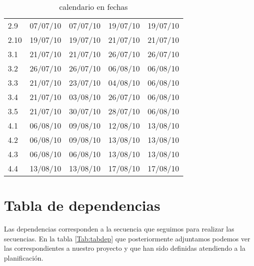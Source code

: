 \documentclass[11pt,a4paper,spanish,twoside]{report}
\begin{document}
\begin{table}[!h]
\begin{tabular}{|b{1.8cm}||b{2.2cm}|b{2.2cm}||b{2.2cm}|b{2.2cm}|}
     2.9   & 07/07/10 & 07/07/10 & 19/07/10 & 19/07/10 \\
     2.10  & 19/07/10 & 19/07/10 & 21/07/10 & 21/07/10 \\
     \hline
     3.1   & 21/07/10 & 21/07/10 & 26/07/10 & 26/07/10 \\
     3.2   & 26/07/10 & 26/07/10 & 06/08/10 & 06/08/10 \\
     3.3   & 21/07/10 & 23/07/10 & 04/08/10 & 06/08/10 \\
     3.4   & 21/07/10 & 03/08/10 & 26/07/10 & 06/08/10 \\
     3.5   & 21/07/10 & 30/07/10 & 28/07/10 & 06/08/10 \\
     \hline
     4.1   & 06/08/10 & 09/08/10 & 12/08/10 & 13/08/10 \\
     4.2   & 06/08/10 & 09/08/10 & 13/08/10 & 13/08/10 \\
     4.3   & 06/08/10 & 06/08/10 & 13/08/10 & 13/08/10 \\
     4.4   & 13/08/10 & 13/08/10 & 17/08/10 & 17/08/10 \\
     \hline
  \end{tabular}
  \caption{calendario en fechas} \label{Tab:calfec}
\end{table}

\section{Tabla de dependencias}
Las dependencias corresponden a la secuencia que seguimos para realizar las
secuencias. En la tabla \ref{Tab:tabdep} que posteriormente adjuntamos podemos
ver las correspondientes a nuestro proyecto y que han sido definidas
atendiendo a la planificación.
\end{document}
